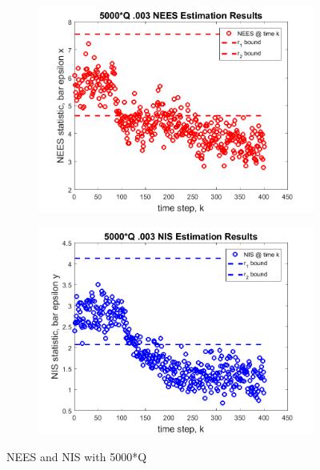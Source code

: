 \documentclass[12pt]{extarticle}
\begin{document}
{{\begin{figure}[h!]
    \begin{subfigure}[b]{0.49\textwidth}
        \centering
        \includegraphics[width=\textwidth]{Images/5000NEES.png}
    \end{subfigure}
    \begin{subfigure}[b]{0.49\textwidth}
        \centering
        \includegraphics[width=\textwidth]{Images/5000NIS.png}
    \end{subfigure}
    \caption{NEES and NIS with 5000*Q}
    \label{nissim5}
\end{figure}
}
}
\vspace{2cm}
\end{document}
